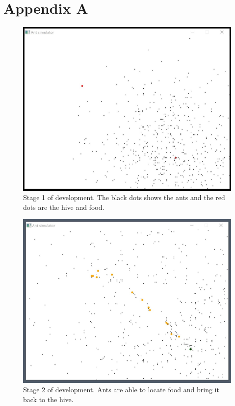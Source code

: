 \documentclass[a4paper, oneside, 11pt]{report}
\begin{document}



\chapter*{Appendix A}
\begin{figure}[htb]
	\begin{center}
		\includegraphics[width=0.65 \columnwidth]{Stage_1.jpg}
		\caption{Stage 1 of development. The black dots shows the ants and the red dots are the hive and food.}
		\label{fig:Stage 1}
	\end{center}
\end{figure}

\begin{figure}[htb]
	\begin{center}
		\includegraphics[width=0.65 \columnwidth]{Stage_2.jpg}
		\caption{Stage 2 of development. Ants are able to locate food and bring it back to the hive.}
		\label{fig:Stage 2}
	\end{center}
\end{figure}
\end{document}
